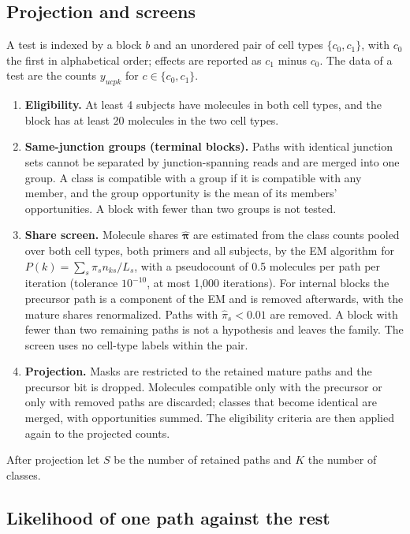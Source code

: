 \documentclass[11pt]{article}
\begin{document}
\subsection{Projection and screens}

A test is indexed by a block $b$ and an unordered pair of cell types $\{c_0,c_1\}$, with $c_0$ the first in alphabetical order; effects are reported as $c_1$ minus $c_0$. The data of a test are the counts $y_{ucpk}$ for $c\in\{c_0,c_1\}$.
\begin{enumerate}[leftmargin=*]
  \item \textbf{Eligibility.} At least 4 subjects have molecules in both cell types, and the block has at least 20 molecules in the two cell types.
  \item \textbf{Same-junction groups (terminal blocks).} Paths with identical junction sets cannot be separated by junction-spanning reads and are merged into one group. A class is compatible with a group if it is compatible with any member, and the group opportunity is the mean of its members' opportunities. A block with fewer than two groups is not tested.
  \item \textbf{Share screen.} Molecule shares $\widehat{\bm\pi}$ are estimated from the class counts pooled over both cell types, both primers and all subjects, by the EM algorithm for $P(k)=\sum_s\pi_sn_{ks}/L_s$, with a pseudocount of 0.5 molecules per path per iteration (tolerance $10^{-10}$, at most 1{,}000 iterations). For internal blocks the precursor path is a component of the EM and is removed afterwards, with the mature shares renormalized. Paths with $\widehat\pi_s<0.01$ are removed. A block with fewer than two remaining paths is not a hypothesis and leaves the family. The screen uses no cell-type labels within the pair.
  \item \textbf{Projection.} Masks are restricted to the retained mature paths and the precursor bit is dropped. Molecules compatible only with the precursor or only with removed paths are discarded; classes that become identical are merged, with opportunities summed. The eligibility criteria are then applied again to the projected counts.
\end{enumerate}
After projection let $S$ be the number of retained paths and $K$ the number of classes.

\subsection{Likelihood of one path against the rest}
\end{document}
